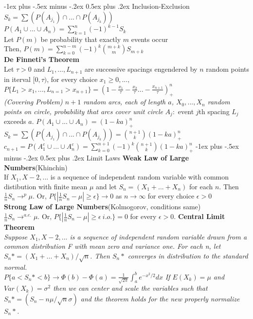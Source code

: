 \documentclass[10pt,landscape]{article}
\makeatletter
\renewcommand{\section}{\@startsection{section}{1}{0mm}%
                                {-1ex plus -.5ex minus -.2ex}%
                                {0.5ex plus .2ex}%
                                {\normalfont\large\bfseries}}
\makeatother
\begin{document}
\begin{multicols*}{3}
\section{Inclusion-Exclusion}
\textit{$S_k= \sum (P(A_{j_1}) \cap...\cap P(A_{j_k}))$}\\
\textit{$P(A_1 \cup ...\cup A_n)=\sum_{k=1}^{n} (-1)^{k-1}S_k$}\\
Let $P(m)$ be probability that exactly $m$ events occur \\
Then, \textit{$P(m)=\sum_{k=0}^{n-m}(-1)^{k}{m+k \choose m}S_{m+k}$}\\ 
\textbf{De Finneti's Theorem}\\
Let $\tau>0$ and $L_1 ,..., L_{n+1}$ are successive spacings engendered by $n$ random points in iterval $[0,\tau)$, for every choice $x_1\geq 0, ...,$
\textit{$P\{L_1>x_1,...,L_{n=1}>x_{n+1}\}=(1-\frac{x_1}{\tau}-\frac{x_2}{\tau}...-\frac{x_{n+1}}{\tau})^n_+$}\\
\textit{(Covering Problem) $n+1$ random arcs, each of length $a$, $X_0,...,X_n$ random points on circle, probability that arcs cover unit circle}
$A_j:$ event $j$th spacing $L_j$ exceeds $a$. \textit{$P(A_1 \cup ...\cup A_n)=(1-ka)^n_+$}
\textit{$S_k= \sum (P(A_{j_1}) \cap...\cap P(A_{j_k}))={n+1 \choose k} (1-ka)^n_+$}\\
\textit{$c_{n+1}=P(A_{1}^{c} \cup ...\cup A_{n}^{c})=\sum_{k=0}^{n+1}(-1)^{k}{n+1 \choose k}(1-ka)^n_+$ }  
\section{Limit Laws}
\textbf{Weak Law of Large Numbers}(Khinchin)\\
If $X_1,X-2,...$ is a sequence of independent random variable with common distibution with finite mean $\mu$ and let $S_n=(X_1+...+X_n)$ for each $n$. Then $\frac{1}{n} S_n \rightarrow^{p} \mu$. Or, $P\{|\frac{1}{n} S_n - \mu | \geq \epsilon\} \rightarrow 0$ as $n \rightarrow \infty$ for every choice $\epsilon>0$\\
\textbf{Strong Law of Large Numbers}(Kolmogorov, conditions same)\\
$\frac{1}{n} S_n \rightarrow^{a.e.} \mu$. Or,  $P\{|\frac{1}{n} S_n - \mu | \geq \epsilon\ i.o.\}=0$ for every $\epsilon>0$.
\textbf{Central Limit Theorem}\\
\textit{Suppose $X_1,X-2,...$ is a sequence of independent random variable drawn from a common distribution F with mean zero and variance one. For each n, let $S_n*=(X_1+...+X_n)/\sqrt{n}$. Then $S_n*$ converges in distribution to the standard normal.}\\
	$P\{a<S_n*<b\}\rightarrow\Phi(b)-\Phi(a)=\frac{1}{\sqrt{2\pi}}\int_{a}^{b}e^{-x^2/2}dx$
\textit{If $E(X_k)=\mu$ and $Var(X_k)=\sigma^2$ then we can center and scale the variables such that $S_n*=(S_n - n\mu/\sqrt{n}\sigma)$ and the theorem holds for the new properly normalize $S_n*$.}


\end{multicols*}
\end{document}
